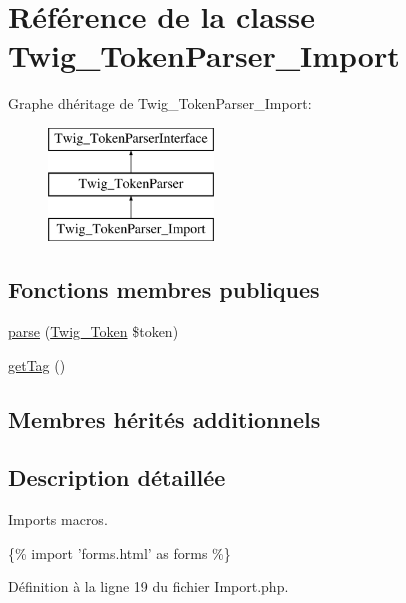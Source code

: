 \hypertarget{class_twig___token_parser___import}{}\section{Référence de la classe Twig\+\_\+\+Token\+Parser\+\_\+\+Import}
\label{class_twig___token_parser___import}
Graphe d\textquotesingle{}héritage de Twig\+\_\+\+Token\+Parser\+\_\+\+Import\+:\begin{figure}[H]
\begin{center}
\leavevmode
\includegraphics[height=3.000000cm]{class_twig___token_parser___import}
\end{center}
\end{figure}
\subsection*{Fonctions membres publiques}
\begin{DoxyCompactItemize}
\item 
\hyperlink{class_twig___token_parser___import_a5dfa2e269321584fb74e8b43dabe0efd}{parse} (\hyperlink{class_twig___token}{Twig\+\_\+\+Token} \$token)
\item 
\hyperlink{class_twig___token_parser___import_ab86ba36154b20e6bbfa3ba705f12f9d6}{get\+Tag} ()
\end{DoxyCompactItemize}
\subsection*{Membres hérités additionnels}


\subsection{Description détaillée}
Imports macros.


\begin{DoxyPre}
  \{\% import 'forms.html' as forms \%\}
\end{DoxyPre}
 

Définition à la ligne 19 du fichier Import.\+php.



